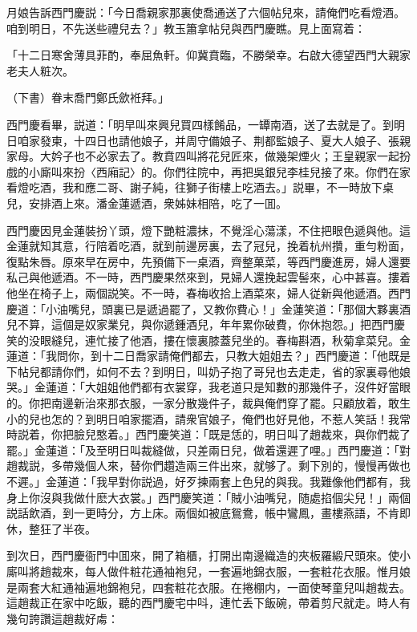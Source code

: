 月娘告訴西門慶説：「今日喬親家那裏使喬通送了六個帖兒來，請俺們吃看燈酒。咱到明日，不先送些禮兒去？」教玉簫拿帖兒與西門慶瞧。見上面寫着：

「十二日寒舍薄具菲酌，奉屈魚軒。仰冀賁臨，不勝榮幸。右啟大德望西門大親家老夫人粧次。

（下書）眷末喬門鄭氏歛袵拜。」

西門慶看畢，説道：「明早叫來興兒買四樣餚品，一罈南酒，送了去就是了。到明日咱家發柬，十四日也請他娘子，并周守備娘子、荆都監娘子、夏大人娘子、張親家母。大妗子也不必家去了。教賁四叫將花兒匠來，做幾架煙火；王皇親家一起扮戲的小廝叫來扮〈西廂記〉的。你們往院中，再把吳銀兒李桂兒接了來。你們在家看燈吃酒，我和應二哥、謝子純，往獅子街樓上吃酒去。」説畢，不一時放下桌兒，安排酒上來。潘金蓮遞酒，衆姊妹相陪，吃了一囬。

西門慶因見金蓮裝扮丫頭，燈下艷粧濃抹，不覺淫心蕩漾，不住把眼色遞與他。這金蓮就知其意，行陪着吃酒，就到前邊房裏，去了冠兒，挽着杭州攢，重勻粉面，復點朱唇。原來早在房中，先預備下一桌酒，齊整菓菜，等西門慶進房，婦人還要私己與他遞酒。不一時，西門慶果然來到，見婦人還挽起雲髻來，心中甚喜。摟着他坐在椅子上，兩個説笑。不一時，春梅收拾上酒菜來，婦人従新與他遞酒。西門慶道：「小油嘴兒，頭裏已是遞過罷了，又教你費心！」金蓮笑道：「那個大夥裏酒兒不算，這個是奴家業兒，與你遞鍾酒兒，年年累你破費，你休抱怨。」把西門慶笑的没眼縫兒，連忙接了他酒，摟在懷裏膝蓋兒坐的。春梅斟酒，秋菊拿菜兒。金蓮道：「我問你，到十二日喬家請俺們都去，只教大姐姐去？」西門慶道：「他既是下帖兒都請你們，如何不去？到明日，叫奶子抱了哥兒也去走走，省的家裏尋他娘哭。」金蓮道：「大姐姐他們都有衣裳穿，我老道只是知數的那幾件子，沒件好當眼的。你把南邊新治來那衣服，一家分散幾件子，裁與俺們穿了罷。只顧放着，敢生小的兒也怎的？到明日咱家擺酒，請衆官娘子，俺們也好見他，不惹人笑話！我常時説着，你把臉兒憨着。」西門慶笑道：「既是恁的，明日叫了趙裁來，與你們裁了罷。」金蓮道：「及至明日叫裁縫做，只差兩日兒，做着還遲了哩。」西門慶道：「對趙裁説，多帶幾個人來，替你們趲造兩三件出來，就够了。剩下別的，慢慢再做也不遲。」金蓮道：「我早對你説過，好歹揀兩套上色兒的與我。我難像他們都有，我身上你沒與我做什麽大衣裳。」西門慶笑道：「賊小油嘴兒，随處掐個尖兒！」兩個説話飲酒，到一更時分，方上床。兩個如被底鴛鴦，帳中鸞鳳，畫樓燕語，不肯即休，整狂了半夜。

到次日，西門慶衙門中囬來，開了箱櫃，打開出南邊織造的夾板羅緞尺頭來。使小廝叫將趙裁來，每人做件粧花通袖袍兒，一套遍地錦衣服，一套粧花衣服。惟月娘是兩套大紅通袖遍地錦袍兒，四套粧花衣服。在捲棚内，一面使琴童兒叫趙裁去。這趙裁正在家中吃飯，聽的西門慶宅中呌，連忙丢下飯碗，帶着剪尺就走。時人有幾句誇讚這趙裁好䖏：

